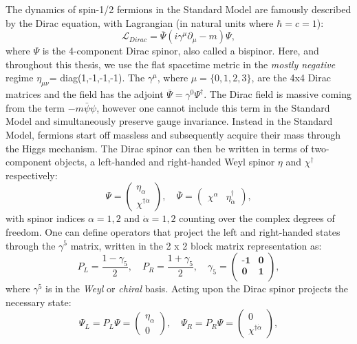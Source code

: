 The dynamics of spin-1/2 fermions in the Standard Model are famously described by the Dirac equation, with Lagrangian (in natural units where $\hbar=c=1$):
\begin{equation}
\mathcal{L}_{Dirac}=\overline{\Psi}(i\gamma^{\mu}\partial_{\mu}-m)\Psi,
\end{equation}
where $\Psi$ is the 4-component Dirac spinor, also called a bispinor. Here, and throughout this thesis, we use the flat spacetime metric in the \textit{mostly negative} regime $\eta_{\mu\nu}$= diag(1,-1,-1,-1). The $\gamma^{\mu}$, where $\mu=\{0,1,2,3\}$, are the 4x4 Dirac matrices and the field has the adjoint $\overline{\Psi}=\gamma^{0}\Psi^{\dagger}$. The Dirac field is massive coming from the term $-m\bar{\psi}\psi$, however one cannot include this term in the Standard Model and simultaneously preserve gauge invariance. Instead in the Standard Model, fermions start off massless and subsequently acquire their mass through the Higgs mechanism. The Dirac spinor can then be written in terms of two-component objects, a left-handed and right-handed Weyl spinor $\eta$ and $\chi^{\dagger}$ respectively:
\begin{equation}
\Psi=\begin{pmatrix}
\eta_{\alpha} \\
\chi^{\dagger \dot{\alpha}}
\end{pmatrix},\quad
\overline{\Psi}=\begin{pmatrix}
\chi^{\alpha} &
\eta^{\dagger}_{\dot{\alpha}}
\end{pmatrix},
\end{equation}
with spinor indices $\alpha=1,2$ and $\dot{\alpha}=1,2$ counting over the complex degrees of freedom. One can define operators that project the left and right-handed states through the $\gamma^{5}$ matrix, written in the 2 x 2 block matrix representation as:
\begin{equation}
P_{L}=\frac{1-\gamma_{5}}{2},\quad P_{R}=\frac{1+\gamma_{5}}{2},\quad \gamma_{5}=\begin{pmatrix}
\textbf{-1} & \textbf{0} \\
\textbf{0} & \textbf{1} \\
\end{pmatrix},
\end{equation}
where $\gamma^5$ is in the \textit{Weyl} or \textit{chiral} basis. Acting upon the Dirac spinor projects the necessary state:
\begin{equation}
\Psi_{L}=P_{L}\Psi=\begin{pmatrix}
\eta_{\alpha} \\
0
\end{pmatrix}
,\quad \Psi_{R}=P_{R}\Psi=\begin{pmatrix}
0 \\
\chi^{\dagger \dot{\alpha}}
\end{pmatrix},
\end{equation}
